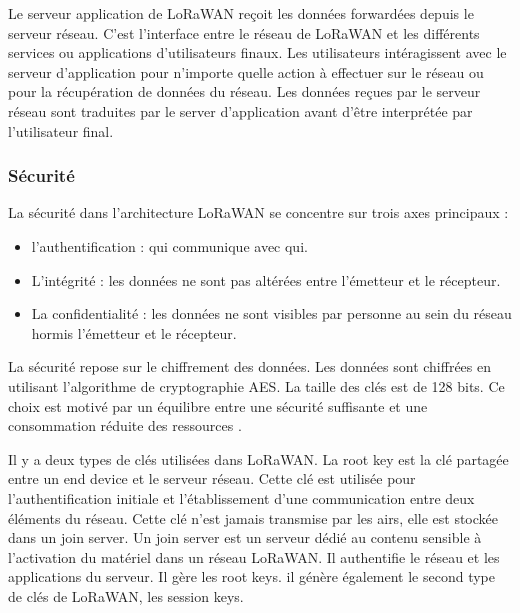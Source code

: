 \vspace{0.1cm}

Le serveur application de LoRaWAN reçoit les données forwardées depuis le serveur réseau. C'est l'interface entre le réseau de LoRaWAN et les différents services ou applications d'utilisateurs finaux. Les utilisateurs intéragissent avec le serveur d'application pour n'importe quelle action à effectuer sur le réseau ou pour la récupération de données du réseau. Les données reçues par le serveur réseau sont traduites par le server d'application avant d'être interprétée par l'utilisateur final.

\subsubsection{Sécurité}

La sécurité dans l'architecture LoRaWAN se concentre sur trois axes principaux :

\begin{itemize}
\item l'authentification : qui communique avec qui.
\item L'intégrité : les données ne sont pas altérées entre l'émetteur et le récepteur.
\item La confidentialité : les données ne sont visibles par personne au sein du réseau hormis l'émetteur et le récepteur. 
\end{itemize}

\vspace{0.1cm}

La sécurité repose sur le chiffrement des données. Les données sont chiffrées en utilisant l'algorithme de cryptographie \ac{AES}. La taille des clés est de 128 bits. Ce choix est motivé par un équilibre entre une sécurité suffisante et une consommation réduite des ressources \cite{loraes}.

\vspace{0.1cm}

Il y a deux types de clés utilisées dans LoRaWAN. La root key est la clé partagée entre un end device et le serveur réseau. Cette clé est utilisée pour l'authentification initiale et l'établissement d'une communication entre deux éléments du réseau. Cette clé n'est jamais transmise par les airs, elle est stockée dans un join server. Un join server est un serveur dédié au contenu sensible à l'activation du matériel dans un réseau LoRaWAN. Il authentifie le réseau et les applications du serveur. Il gère les root keys. il génère également le second type de clés de LoRaWAN, les session keys.

